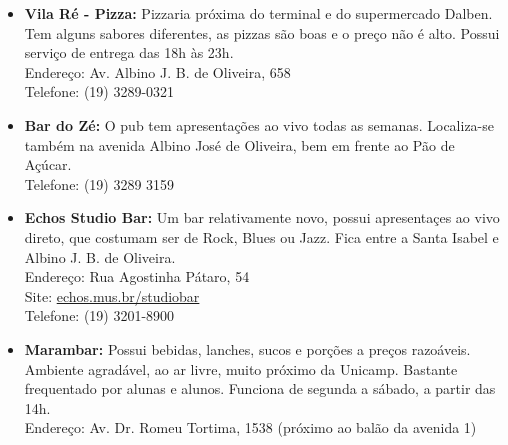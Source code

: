 \begin{itemize}
    \item   \textbf{Vila Ré - Pizza:} Pizzaria próxima do terminal e do
        supermercado Dalben. Tem alguns sabores diferentes, as pizzas são boas e
        o preço não é alto. Possui serviço de entrega das 18h às 23h.
        \\Endereço: Av. Albino J. B. de Oliveira, 658
        \\Telefone: (19) 3289-0321

    \item   \textbf{Bar do Zé:} O pub tem apresentações ao vivo todas as
        semanas.  Localiza-se também na avenida Albino José de Oliveira, bem em
        frente ao Pão de Açúcar.
        \\Telefone: (19) 3289 3159

    \item   \textbf{Echos Studio Bar:} Um bar relativamente novo, possui
        apresentaçes ao vivo direto, que costumam ser de Rock, Blues ou Jazz.
        Fica entre a Santa Isabel e Albino J. B. de Oliveira.
        \\Endereço: Rua Agostinha Pátaro, 54
        \\Site: \url{echos.mus.br/studiobar}
        \\Telefone: (19) 3201-8900

    \item   \textbf{Marambar:} Possui bebidas, lanches, sucos e porções a
        preços razoáveis. Ambiente agradável, ao ar livre, muito próximo da
        Unicamp. Bastante frequentado por alunas e alunos. Funciona de segunda
        a sábado, a partir das 14h.
        \\Endereço: Av. Dr. Romeu Tortima, 1538 (próximo ao balão da avenida 1)

\end{itemize}

